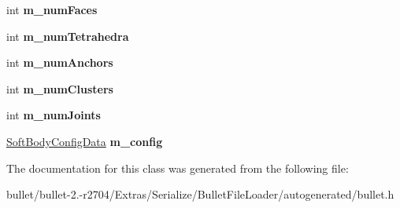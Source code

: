 \begin{DoxyCompactItemize}
\item 
\hypertarget{class_bullet_1_1bt_soft_body_float_data_a6ce7c24e765d60ed9d9578677699d838}{int {\bfseries m\+\_\+num\+Faces}}\label{class_bullet_1_1bt_soft_body_float_data_a6ce7c24e765d60ed9d9578677699d838}

\item 
\hypertarget{class_bullet_1_1bt_soft_body_float_data_a105175dc12ebd3734599a3ceac00e59a}{int {\bfseries m\+\_\+num\+Tetrahedra}}\label{class_bullet_1_1bt_soft_body_float_data_a105175dc12ebd3734599a3ceac00e59a}

\item 
\hypertarget{class_bullet_1_1bt_soft_body_float_data_a2671468aa79478df0c294c82b4ead0f1}{int {\bfseries m\+\_\+num\+Anchors}}\label{class_bullet_1_1bt_soft_body_float_data_a2671468aa79478df0c294c82b4ead0f1}

\item 
\hypertarget{class_bullet_1_1bt_soft_body_float_data_a559f42af72aca1fb931897a41dbd8f3f}{int {\bfseries m\+\_\+num\+Clusters}}\label{class_bullet_1_1bt_soft_body_float_data_a559f42af72aca1fb931897a41dbd8f3f}

\item 
\hypertarget{class_bullet_1_1bt_soft_body_float_data_a1b258cbb6cb6bbb17e53b2b9f4359df4}{int {\bfseries m\+\_\+num\+Joints}}\label{class_bullet_1_1bt_soft_body_float_data_a1b258cbb6cb6bbb17e53b2b9f4359df4}

\item 
\hypertarget{class_bullet_1_1bt_soft_body_float_data_aa051844e13ec4b8d6e7bb3b74d43ef41}{\hyperlink{class_bullet_1_1_soft_body_config_data}{Soft\+Body\+Config\+Data} {\bfseries m\+\_\+config}}\label{class_bullet_1_1bt_soft_body_float_data_aa051844e13ec4b8d6e7bb3b74d43ef41}

\end{DoxyCompactItemize}


The documentation for this class was generated from the following file\+:\begin{DoxyCompactItemize}
\item 
bullet/bullet-\/2.-\/r2704/\+Extras/\+Serialize/\+Bullet\+File\+Loader/autogenerated/bullet.\+h\end{DoxyCompactItemize}
